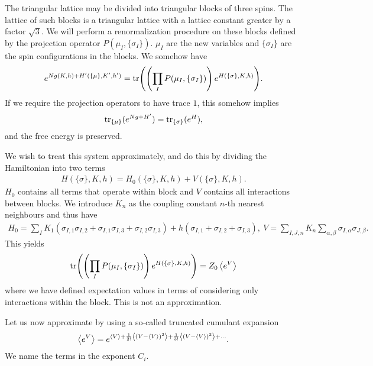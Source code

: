 The triangular lattice may be divided into triangular blocks of three spins. The lattice of such blocks is a triangular lattice with a lattice constant greater by a factor $\sqrt{3}$. We will perform a renormalization procedure on these blocks defined by the projection operator $P(\mu_{I}, \{\sigma_{I}\})$. $\mu_{I}$ are the new variables and $\{\sigma_{I}\}$ are the spin configurations in the blocks. We somehow have
\begin{align*}
	e^{Ng(K, h) + H^{\prime}(\{\mu\}, K^{\prime}, h^{\prime})} = \tr(\left(\prod\limits_{I}P(\mu_{I}, \{\sigma_{I}\})\right)e^{H(\{\sigma\}, K , h)}).
\end{align*}
If we require the projection operators to have trace $1$, this somehow implies
\begin{align*}
	\tr\limits_{\{\mu\}}(e^{Ng + H^{\prime}}) = \tr\limits_{\{\sigma\}}(e^{H}),
\end{align*}
and the free energy is preserved.

We wish to treat this system approximately, and do this by dividing the Hamiltonian into two terms
\begin{align*}
	H(\{\sigma\}, K, h) = H_{0}(\{\sigma\}, K, h) + V(\{\sigma\}, K, h).
\end{align*}
$H_{0}$ contains all terms that operate within block and $V$ contains all interactions between blocks. We introduce $K_{n}$ as the coupling constant $n$-th nearest neighbours and thus have
\begin{align*}
	H_{0} = \sum\limits_{I}K_{1}(\sigma_{I, 1}\sigma_{I, 2} + \sigma_{I, 1}\sigma_{I, 3} + \sigma_{I, 2}\sigma_{I, 3}) + h(\sigma_{I, 1} + \sigma_{I, 2} + \sigma_{I, 3}),\ V = \sum\limits_{I, J, n}K_{n}\sum\limits_{\alpha, \beta}\sigma_{I, \alpha}\sigma_{J, \beta}.
\end{align*}
This yields
\begin{align*}
	\tr(\left(\prod\limits_{I}P(\mu_{I}, \{\sigma_{I}\})\right)e^{H(\{\sigma\}, K , h)}) = Z_{0}\expval{e^{V}}
\end{align*}
where we have defined expectation values in terms of considering only interactions within the block. This is not an approximation.

Let us now approximate by using a so-called truncated cumulant expansion
\begin{align*}
	\expval{e^{V}} = e^{\expval{V} + \frac{1}{2!}\expval{(V - \expval{V})^{2}} + \frac{1}{3!}\expval{(V - \expval{V})^{3}} + \dots}.
\end{align*}
We name the terms in the exponent $C_{i}$.

